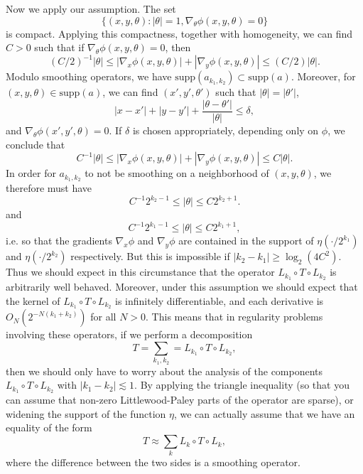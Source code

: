 %
Now we apply our assumption. The set
%
\[ \{ (x,y,\theta) : |\theta| = 1, \nabla_\theta \phi(x,y,\theta) = 0 \} \] 
%
is compact. Applying this compactness, together with homogeneity, we can find $C > 0$ such that if $\nabla_\theta \phi(x,y,\theta) = 0$, then
%
\[ (C/2)^{-1} |\theta| \leq |\nabla_x \phi(x,y,\theta)| + |\nabla_y \phi(x,y,\theta)| \leq (C/2) |\theta|. \]
%
Modulo smoothing operators, we have $\text{supp}(a_{k_1,k_2}) \subset \text{supp}(a)$. Moreover, for $(x,y,\theta) \in \text{supp}(a)$, we can find $(x',y',\theta')$ such that $|\theta| = |\theta'|$,
%
\[ |x - x'| + |y - y'| + \frac{|\theta - \theta'|}{|\theta|} \leq \delta, \]
%
and $\nabla_\theta \phi(x',y',\theta) = 0$. If $\delta$ is chosen appropriately, depending only on $\phi$, we conclude that
%
\[ C^{-1} |\theta| \leq |\nabla_x \phi(x,y,\theta)| + |\nabla_y \phi(x,y,\theta)| \leq C |\theta|. \]
%
In order for $a_{k_1,k_2}$ to not be smoothing on a neighborhood of $(x,y,\theta)$, we therefore must have
%
\[ C^{-1} 2^{k_2 - 1} \leq |\theta| \leq C 2^{k_2 + 1}. \]
%
and
%
\[ C^{-1} 2^{k_1 - 1} \leq |\theta| \leq C 2^{k_1 + 1}, \]
%
i.e. so that the gradients $\nabla_x \phi$ and $\nabla_y \phi$ are contained in the support of $\eta(\cdot / 2^{k_1})$ and $\eta( \cdot / 2^{k_2} )$ respectively. But this is impossible if $|k_2 - k_1| \geq \log_2(4C^2)$. Thus we should expect in this circumstance that the operator $L_{k_1} \circ T \circ L_{k_2}$ is arbitrarily well behaved. Moreover, under this assumption we should expect that the kernel of $L_{k_1} \circ T \circ L_{k_2}$ is infinitely differentiable, and each derivative is $O_N( 2^{-N (k_1 + k_2)} )$ for all $N > 0$. This means that in regularity problems involving these operators, if we perform a decomposition
%
\[ T = \sum_{k_1,k_2} = L_{k_1} \circ T \circ L_{k_2}, \]
%
then we should only have to worry about the analysis of the components $L_{k_1} \circ T \circ L_{k_2}$ with $|k_1 - k_2| \lesssim 1$. By applying the triangle inequality (so that you can assume that non-zero Littlewood-Paley parts of the operator are sparse), or widening the support of the function $\eta$, we can actually assume that we have an equality of the form
%
\[ T \approx \sum_k L_k \circ T \circ L_k, \]
%
where the difference between the two sides is a smoothing operator.

